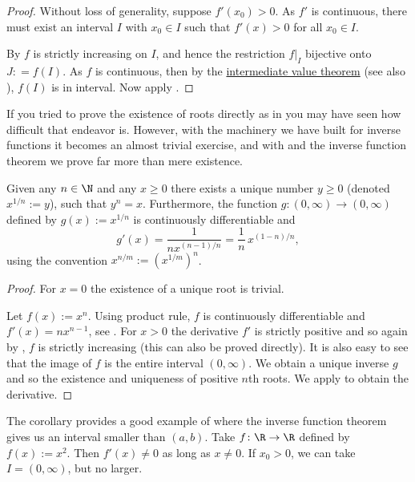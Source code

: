 \documentclass[12pt]{book}
\begin{document}
\begin{proof}
Without loss of generality, suppose $f'(x_0) > 0$.
As $f'$ is
continuous, there must exist an interval $I$ with $x_0 \in I$
such that $f'(x) > 0$ for all $x_0 \in I$.

By  $f$ is strictly increasing
on $I$, and hence the restriction $f|_{I}$ bijective onto $J: = f(I)$.
As $f$ is continuous, then by the
\hyperref[IVT:thm]{intermediate value theorem}
(see also ), $f(I)$ is in interval.
Now apply .
\end{proof}

If you tried to prove the existence of roots directly as in
 you may have seen
how difficult that endeavor is.
However, with the machinery we have built
for inverse functions it becomes
an almost trivial exercise, and with and the inverse function theorem
we prove far more than mere existence.

\begin{cor}
Given any $n \in \N$ and any $x \geq 0$ there exists a unique 
number $y \geq 0$ (denoted $x^{1/n} := y$), such that $y^n = x$.
Furthermore,
the function $g \colon (0,\infty) \to (0,\infty)$ defined by
$g(x) := x^{1/n}$ is continuously differentiable and
\begin{equation*}
g'(x) = \frac{1}{nx^{(n-1)/n}} = \frac{1}{n} \, x^{(1-n)/n} ,
\end{equation*}
using the convention $x^{n/m} := {(x^{1/m})}^{n}$.
\end{cor}

\begin{proof}
For $x=0$ the existence of a unique root is trivial.

Let $f(x) := x^n$.
Using product rule, $f$ is continuously differentiable
and $f'(x) = nx^{n-1}$, see .
For $x > 0$ the derivative $f'$ is strictly positive
and so again by , $f$ is strictly
increasing (this can also be proved directly).
It is also easy to
see that the image of $f$ is the entire interval $(0,\infty)$.
We 
obtain a unique inverse $g$ and so the existence and uniqueness of positive
$n$th roots.
We apply  to obtain the derivative.
\end{proof}

\begin{example}
The corollary provides a good example of where the inverse function theorem
gives us an interval smaller than $(a,b)$.
Take $f \colon \R \to \R$
defined by $f(x) := x^2$.
Then $f'(x) \not= 0$
as long as $x \not= 0$.
If $x_0 > 0$, we can take $I=(0,\infty)$, but
no larger.
\end{example}
\end{document}
